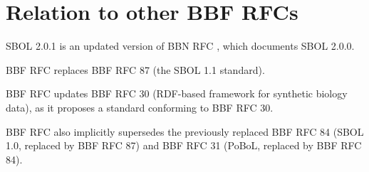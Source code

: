 \section{Relation to other BBF RFCs}

SBOL 2.0.1 is an updated version of BBN RFC \rfcnum{}, which documents SBOL 2.0.0.

BBF RFC \rfcnum{} replaces BBF RFC 87 (the SBOL 1.1 standard).

BBF RFC \rfcnum{} updates BBF RFC 30 (RDF-based framework for synthetic biology data), as it proposes a standard conforming to BBF RFC 30.

BBF RFC \rfcnum{} also implicitly supersedes the previously replaced BBF RFC 84 (SBOL 1.0, replaced by BBF RFC 87) and BBF RFC 31 (PoBoL, replaced by BBF RFC 84).